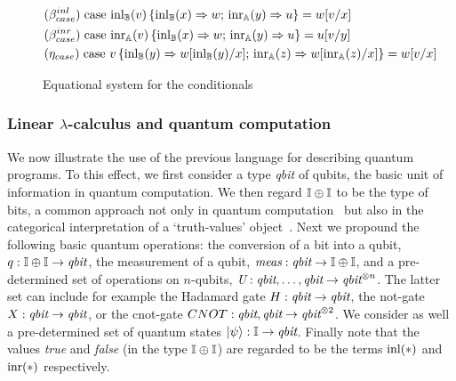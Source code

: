 \documentclass[10pt,a4paper]{amsart}
\theoremstyle{definition}
\theoremstyle{definition}
\theoremstyle{definition}
\theoremstyle{definition}
\theoremstyle{definition}
\theoremstyle{definition}
\begin{document}
  \begin{figure}[h!]
    \centering
    \begin{tcolorbox}[colframe=black, colback=white, boxrule=0.6pt, arc=1pt,boxsep=1pt,top=1pt,bottom=1pt, width=0.85 \textwidth]
    \begin{equation*}
        \begin{split}
          &(\beta_{case}^{inl}) \hspace{3pt} \text{case } 
          \mathrm{inl}_{\mathbb{B}}(v)\, \{ \mathrm{inl}_{\mathbb{B}} (x) \Rightarrow w 
          ;\, \mathrm{inr}_{\mathbb{A}} (y) 
          \Rightarrow u\}= w[v/x]
          \\
          &(\beta_{case}^{inr}) \hspace{3pt} \text{case } 
          \mathrm{inr}_{\mathbb{A}}(v)\, \{ \mathrm{inl}_{\mathbb{B}} (x) \Rightarrow w 
          ;\, \mathrm{inr}_{\mathbb{A}} (y) 
          \Rightarrow u\}= u[v/y]
          \\
          & (\eta_{case}) \hspace{3pt} \text{case } v\, \{\text{inl}_{\mathbb{B}} (y) \Rightarrow w [ \text{inl}_{\mathbb{B}}(y)/x] ;\, \text{inr}_{\mathbb{A}} (z) \Rightarrow w [ \text{inr}_{\mathbb{A}}(z)/x]\} = w[v/x] 
        \end{split}
    \end{equation*}
    \end{tcolorbox}
    \caption{Equational system for the conditionals}
    \label{fig:equations-in-context-cond}
    \end{figure}


\subsubsection{Linear $\lambda$-calculus and quantum computation}

We now illustrate the use of the previous language for describing quantum
programs. To this effect, we first consider a type \emph{qbit} of qubits, the
basic unit of information in quantum computation. We then regard $\mathbb{I} \oplus
\mathbb{I}$ to be the type of bits, a common approach not only in quantum
computation~\cite{selinger04} but also in the categorical interpretation of a
`truth-values' object~\cite{johnstone02,cho15}. Next we propound the following
basic quantum operations:  the conversion of a bit into a qubit, $q : \mathbb{I}
\oplus \mathbb{I}  \to \emph{qbit}$, the measurement of a qubit,
$\emph{meas}:\emph{qbit} \to \mathbb{I} \oplus \mathbb{I}$, and a pre-determined set of
operations on $n$-qubits, $\emph{U}:\emph{qbit},\ldots,\emph{qbit} \to
\emph{qbit}^{\otimes n}$. The latter set can include for example the Hadamard
gate $H : \emph{qbit} \to \emph{qbit}$, the not-gate $X : \emph{qbit} \to
\emph{qbit}$, or the cnot-gate $CNOT : \emph{qbit},\emph{qbit} \to
\emph{qbit}^{\otimes 2}$. We consider as well a pre-determined set of quantum
states $\ket{\psi} : \mathbb{I} \to \emph{qbit}$.  Finally note that the values
\emph{true} and \emph{false} (in the type $\mathbb{I} \oplus \mathbb{I}$) are regarded to be 
the terms $\mathrm{inl}(\ast)$ and $\mathrm{inr}(\ast)$ respectively.
\end{document}
